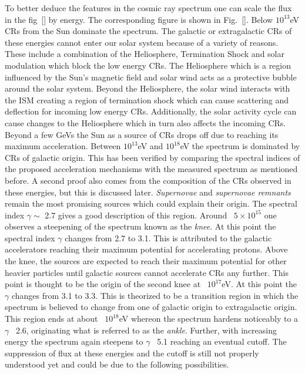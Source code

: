 To better deduce the features in the cosmic ray spectrum one can scale the flux in the fig~\ref{} by energy. The corresponding figure is shown in Fig.~\ref{}. Below $10^{13}$eV CRs from the Sun dominate the spectrum. The galactic or extragalactic CRs of these energies cannot enter our solar system because of a variety of reasons. These include a combination of the Heliosphere, Termination Shock and solar modulation which block the low energy CRs. The Heliosphere which is a region influenced by the Sun's magnetic field and solar wind acts as a protective bubble around the solar system. Beyond the Heliosphere, the solar wind interacts with the ISM creating a region of termination shock which can cause scattering and deflection for incoming low energy CRs. Additionally, the solar activity cycle can cause changes to the Heliosphere which in turn also affects the incoming CRs. Beyond a few GeVs the Sun as a source of CRs drops off due to reaching its maximum acceleration. Between $10^{13}$eV and $10^{18}$eV the spectrum is dominated by CRs of galactic origin. This has been verified by comparing the spectral indices of the proposed acceleration mechanisms with the measured spectrum as mentioned before. A second proof also comes from the composition of the CRs observed in these energies, but this is discussed later. \textit{Supernovae} and \textit{supernovae remnants} remain the most promising sources which could explain their origin. The spectral index $\gamma \sim$ 2.7 gives a good description of this region. Around ~$5 \times 10^{15}$ one observes a steepening of the spectrum known as the \textit{knee}. At this point the spectral index $\gamma$ changes from 2.7 to 3.1. This is attributed to the galactic accelerators reaching their maximum potential for accelerating protons. Above the knee, the sources are expected to reach their maximum potential for other heavier particles until galactic sources cannot accelerate CRs any further. This point is thought to be the origin of the second knee at ~$10^{17}$eV. At this point the $\gamma$ changes from 3.1 to 3.3. This is theorized to be a transition region in which the spectrum is believed to change from one of galactic origin to extragalactic origin. This region ends at about ~$10^{18}$eV whereon the spectrum hardens noticeably to a $\gamma$ ~2.6, originating what is referred to as the \textit{ankle}. Further, with increasing energy the spectrum again steepens to $\gamma$ ~5.1 reaching an eventual cutoff. The suppression of flux at these energies and the cutoff is still not properly understood yet and could be due to the following possibilities.


